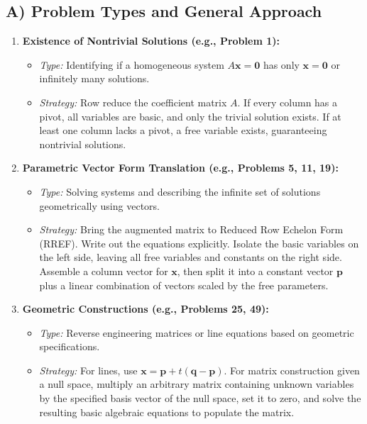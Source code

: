 \documentclass[11pt]{article}
\begin{document}
\subsection{A) Problem Types and General Approach}
\begin{enumerate}
    \item \textbf{Existence of Nontrivial Solutions (e.g., Problem 1):}
    \begin{itemize}
        \item \textit{Type:} Identifying if a homogeneous system $A\mathbf{x} = \mathbf{0}$ has only $\mathbf{x}=\mathbf{0}$ or infinitely many solutions.
        \item \textit{Strategy:} Row reduce the coefficient matrix $A$. If every column has a pivot, all variables are basic, and only the trivial solution exists. If at least one column lacks a pivot, a free variable exists, guaranteeing nontrivial solutions.
    \end{itemize}
    \item \textbf{Parametric Vector Form Translation (e.g., Problems 5, 11, 19):}
    \begin{itemize}
        \item \textit{Type:} Solving systems and describing the infinite set of solutions geometrically using vectors.
        \item \textit{Strategy:} Bring the augmented matrix to Reduced Row Echelon Form (RREF). Write out the equations explicitly. Isolate the basic variables on the left side, leaving all free variables and constants on the right side. Assemble a column vector for $\mathbf{x}$, then split it into a constant vector $\mathbf{p}$ plus a linear combination of vectors scaled by the free parameters.
    \end{itemize}
    \item \textbf{Geometric Constructions (e.g., Problems 25, 49):}
    \begin{itemize}
        \item \textit{Type:} Reverse engineering matrices or line equations based on geometric specifications.
        \item \textit{Strategy:} For lines, use $\mathbf{x} = \mathbf{p} + t(\mathbf{q} - \mathbf{p})$. For matrix construction given a null space, multiply an arbitrary matrix containing unknown variables by the specified basis vector of the null space, set it to zero, and solve the resulting basic algebraic equations to populate the matrix.
    \end{itemize}
\end{enumerate}
\end{document}
